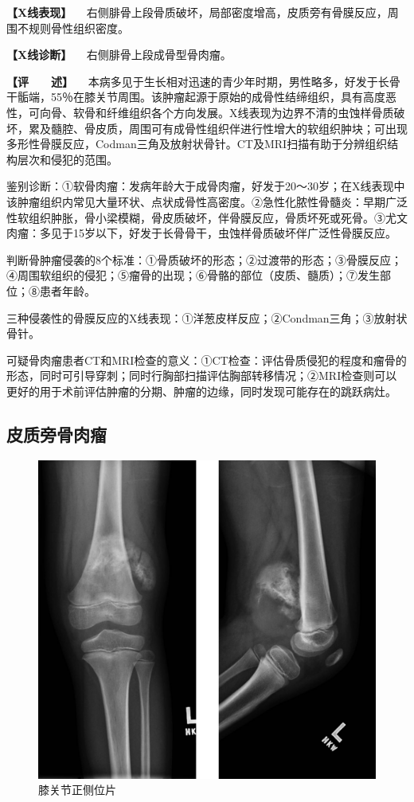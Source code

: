 \textbf{【X线表现】}
　右侧腓骨上段骨质破坏，局部密度增高，皮质旁有骨膜反应，周围不规则骨性组织密度。

\textbf{【X线诊断】} 　右侧腓骨上段成骨型骨肉瘤。

\textbf{【评　　述】}
　本病多见于生长相对迅速的青少年时期，男性略多，好发于长骨干骺端，55％在膝关节周围。该肿瘤起源于原始的成骨性结缔组织，具有高度恶性，可向骨、软骨和纤维组织各个方向发展。X线表现为边界不清的虫蚀样骨质破坏，累及髓腔、骨皮质，周围可有成骨性组织伴进行性增大的软组织肿块；可出现多形性骨膜反应，Codman三角及放射状骨针。CT及MRI扫描有助于分辨组织结构层次和侵犯的范围。

鉴别诊断：①软骨肉瘤：发病年龄大于成骨肉瘤，好发于20～30岁；在X线表现中该肿瘤组织内常见大量环状、点状成骨性高密度。②急性化脓性骨髓炎：早期广泛性软组织肿胀，骨小梁模糊，骨皮质破坏，伴骨膜反应，骨质坏死或死骨。③尤文肉瘤：多见于15岁以下，好发于长骨骨干，虫蚀样骨质破坏伴广泛性骨膜反应。

判断骨肿瘤侵袭的8个标准：①骨质破坏的形态；②过渡带的形态；③骨膜反应；④周围软组织的侵犯；⑤瘤骨的出现；⑥骨骼的部位（皮质、髓质）；⑦发生部位；⑧患者年龄。

三种侵袭性的骨膜反应的X线表现：①洋葱皮样反应；②Condman三角；③放射状骨针。

可疑骨肉瘤患者CT和MRI检查的意义：①CT检查：评估骨质侵犯的程度和瘤骨的形态，同时可引导穿刺；同时行胸部扫描评估胸部转移情况；②MRI检查则可以更好的用于术前评估肿瘤的分期、肿瘤的边缘，同时发现可能存在的跳跃病灶。

\subsection{皮质旁骨肉瘤}

\begin{figure}[!htbp]
 \centering
 \includegraphics{./images/Image00099.jpg}
 \captionsetup{justification=centering}
 \caption{膝关节正侧位片}
 \label{fig2-7-14}
  \end{figure} 

